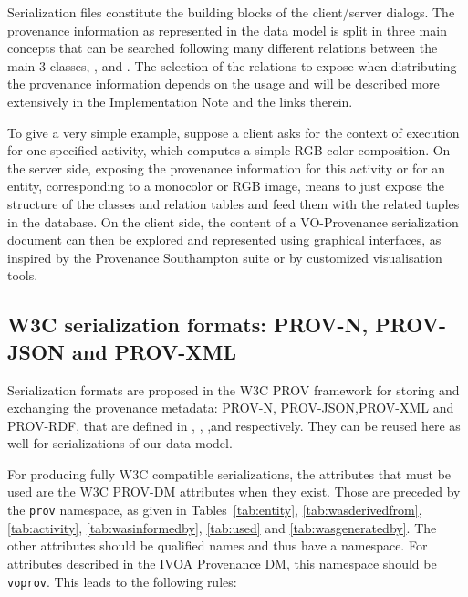 
Serialization files constitute the building blocks of the client/server dialogs.
The provenance information as represented in the data model is split in three main concepts that can be searched following many different relations between the main 3 classes, ,  and .
The selection of the relations to expose when distributing the provenance information depends on the usage and will be described more extensively in the Implementation Note \citep{std:ProvenanceImplementationNote} and the links therein.

To give a very simple example, suppose a client asks for the context of execution for one specified activity, which computes a simple RGB color composition. 
On the server side, exposing the provenance information for this activity or for an entity, corresponding to a monocolor or RGB image, means to just expose the structure of the classes and relation tables and feed them with the related tuples in the database.
On the client side, the content of a VO-Provenance serialization document can then be explored and represented using graphical interfaces, as inspired by the Provenance Southampton suite or by customized visualisation tools.

\subsection{W3C serialization formats: PROV-N, PROV-JSON and PROV-XML}

Serialization formats are proposed in the W3C PROV framework for storing and exchanging the provenance metadata: {PROV-N}, {PROV-JSON},{PROV-XML} and PROV-RDF, that are defined in \cite{std:PROV-N}, \cite{std:PROV-JSON}, \cite{std:PROV-XML},and \cite{std:PROV-O} respectively. 
They can be reused here as well for serializations of our data model. 

For producing fully W3C compatible serializations, the attributes that must be used are the W3C PROV-DM attributes when they exist. Those are preceded by the \texttt{prov} namespace, as given in Tables~\ref{tab:entity}, \ref{tab:wasderivedfrom}, \ref{tab:activity}, \ref{tab:wasinformedby}, \ref{tab:used} and \ref{tab:wasgeneratedby}. The other attributes should be qualified names and thus have a namespace. For attributes described in the IVOA Provenance DM, this namespace should be \texttt{voprov}. This leads to the following rules:

